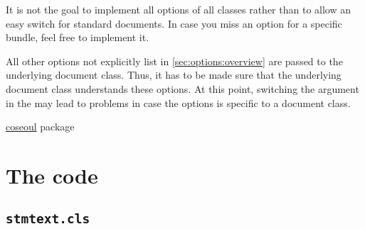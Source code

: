\documentclass[%
  type=article,%
  layout=koma,%
  page=false,%
  cleveref=true,%
  conditionallox=true,%
  conditionalloxnewpage=true,%
  date=true,%
  glossaries=true,%
  hyperref=true,%
  index=true,%
  listings=true%
]{stmtext}
\begin{document}
It is not the goal to implement all options of all classes rather than to allow an easy switch for standard documents. In case you miss an option for a specific bundle, feel free to implement it.






% 


All other options not explicitly list in \cref{sec:options:overview} are passed to the underlying document class. Thus, it has to be made sure that the underlying document class understands these options. At this point, switching the argument in the  may lead to problems in case the options is specific to a document class.

\setcounter{currentlevel}{\basetoclevelnr}
\label{sec:usage}


\href{https://ctan.org/tex-archive/macros/latex/contrib/coseoul}{coseoul} package

\printstmacronyms

\printstmindex

\newpage
\appendix

\section{The code}

\subsection{\protect\texttt{stmtext.cls}}


\end{document}
